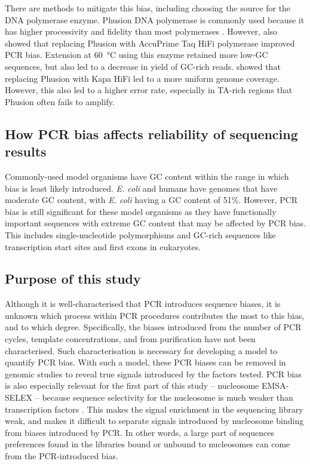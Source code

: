 \documentclass[a4paper, numbers=noenddot]{scrbook}
\begin{document}
There are methods to mitigate this bias, including choosing the source for the DNA polymerase enzyme.  Phusion DNA polymerase is commonly used because it has higher processivity and fidelity than most polymerases \citep{quail_optimal_2012}.  However, \citet{aird_analyzing_2011} also showed that replacing Phusion with AccuPrime Taq HiFi polymerase improved PCR bias.  Extension at \SI{60}{\celsius} using this enzyme retained more low-GC sequences, but also led to a decrease in yield of GC-rich reads.  \citet{quail_optimal_2012} showed that replacing Phusion with Kapa HiFi led to a more uniform genome coverage.  However, this also led to a higher error rate, especially in TA-rich regions that Phusion often fails to amplify.

\subsection{How PCR bias affects reliability of sequencing results}
\label{ssec:pcrbias_intro_effects}

Commonly-used model organisms have GC content within the range in which bias is least likely introduced.  \emph{E. coli} and humans have genomes that have moderate GC content, with \emph{E. coli} having a GC content of 51\%.  However, PCR bias is still significant for these model organisms as they have functionally important sequences with extreme GC content that may be affected by PCR bias.  This includes single-nucleotide polymorphisms and GC-rich sequences like transcription start sites and first exons in eukaryotes.  %

\subsection{Purpose of this study}
\label{ssec:pcrbias_intro_why}

Although it is well-characterised that PCR introduces sequence biases, it is unknown which process within PCR procedures contributes the most to this bias, and to which degree.  Specifically, the biases introduced from the number of PCR cycles, template concentrations, and from purification have not been characterised.  Such characterisation is necessary for developing a model to quantify PCR bias.  With such a model, these PCR biases can be removed in genomic studies to reveal true signals introduced by the factors tested.  PCR bias is also especially relevant for the first part of this study -- nucleosome EMSA-SELEX -- because sequence selectivity for the nucleosome is much weaker than transcription factors \citep{struhl_determinants_2013}.  This makes the signal enrichment in the sequencing library weak, and makes it difficult to separate signals introduced by nucleosome binding from biases introduced by PCR.  In other words, a large part of sequences preferences found in the libraries bound or unbound to nucleosomes can come from the PCR-introduced bias.
\end{document}
